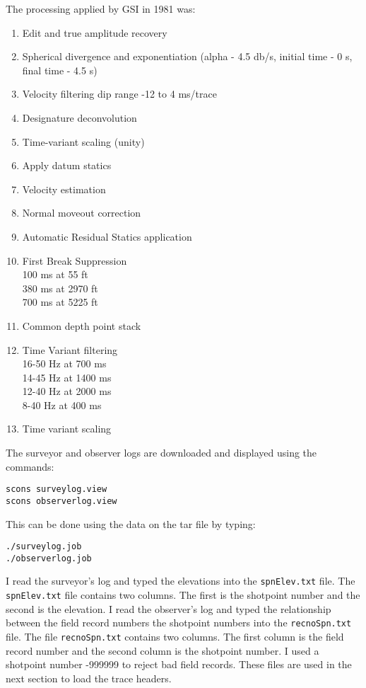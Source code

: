 The processing applied by GSI in 1981 was:
\begin{enumerate}
\item Edit and true amplitude recovery
\item Spherical divergence and exponentiation
(alpha - 4.5 db/s, initial time - 0 s, final time - 4.5 s)
\item Velocity filtering dip range -12 to 4 ms/trace
\item Designature deconvolution
\item Time-variant scaling (unity)
\item Apply datum statics
\item Velocity estimation
\item Normal moveout correction
\item Automatic Residual Statics application
\item First Break Suppression \\
100 ms at 55 ft\\
380 ms at 2970 ft\\
700 ms at 5225 ft
\item Common depth point stack
\item Time Variant filtering \\
16-50 Hz at 700 ms\\
14-45 Hz at 1400 ms\\
12-40 Hz at 2000 ms\\
8-40 Hz at 400 ms
\item Time variant scaling
\end{enumerate}

The surveyor and observer logs are downloaded and displayed using the commands:
\begin{verbatim}
scons surveylog.view 
scons observerlog.view
\end{verbatim}
This can be done using the data on the tar file by typing:
\begin{verbatim}
./surveylog.job
./observerlog.job
\end{verbatim}

I read the surveyor's log and typed the elevations into the
\texttt{spnElev.txt} file.  The \texttt{spnElev.txt} file contains two
columns.  The first is the shotpoint number and the second is the
elevation.  I read the observer's log and typed the relationship
between the field record numbers the shotpoint numbers into the
\texttt{recnoSpn.txt} file.  The file \texttt{recnoSpn.txt} contains two
columns.  The first column is the field record number and the second
column is the shotpoint number. I used a shotpoint number -999999 to
reject bad field records.  These files are used in the next
section to load the trace headers.

